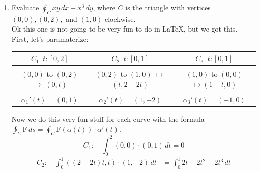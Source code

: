 \documentclass[10pt,oneside]{book}
\newcommand{\dsp}{\displaystyle}
\newcommand{\en}{\vspace{0.25cm}\\}
\newcommand{\centerit}[1]{{\begin{center} #1 \end{center}}}
\begin{document}
\begin{enumerate}
    Next, we need to grab that derivative with respect to time:
    \[\alpha'(t) = (-\sin t, \cos t)\]
    Now, it's just plug and chug with our fancy line integral formula.
    \begin{align*}
        \int_C f\,ds &= \int_C f(\alpha(t))\cdot\alpha'(t)\,dt\\
        \int_C f(\alpha(t))\cdot\alpha'(t)\,dt &= \int_0^{2\pi}(3\sin t + \cos^5t, 2\cos t + e^{\sin t})\cdot (-\sin t, \cos t)\,dt\\
        &=\int_0^{2\pi}-3\sin^2 t + \sin t\cos^5t - 2\cos t\sin t + \cos t e^{\sin t}\,dt\\
        &\quad\text{Note: we use substitution: } 2\cos t\sin t = \sin 2t,\text{ and } \sin^2 t = \frac{1}2(1-\cos(2t))\\
        &=\left[-\frac{3}2t-\frac{1}6\cos^6t+\frac{1}2\cos(2t) + e^{\sin t}\right]\Big|_0^{2\pi}\\
        &\quad\text{Note: All terms except } \frac{3}2t \text{ cancel.}\\
        &= \boxed{-3\pi}
    \end{align*}
    \item Evaluate $\dsp\oint_C xy\,dx + x^3\,dy$, where $C$ is the triangle with vertices $(0,0), (0,2), $ and $(1,0)$ clockwise.\en
    Ok this one is not going to be very fun to do in \LaTeX, but we got this. First, let's paramaterize:
    \centerit{
        \begin{tabular}{ccc}
            $C_1\;\;t:[0,2]$ & $C_2\;\;t:[0,1]$ & $C_3\;\;t:[0,1]$\\
            \hline\\
            $(0,0)$ to $(0,2)$ $\mapsto$ $\boxed{(0,t)}$ & $(0,2)$ to $(1,0)$ $\mapsto$ $\boxed{(t,2-2t)}$ & $(1,0)$ to $(0,0)$ $\mapsto\boxed{(1-t,0)}$  \vspace{0.3cm}\\
            \hline\\
            $\boxed{\alpha_1'(t) = (0,1)}$ & $\boxed{\alpha_2'(t) = (1,-2)}$ & $\boxed{\alpha_3'(t) = (-1,0)}$
        \end{tabular}
    } 
    \newpage
    Now we do this very fun stuff for each curve with the formula $\dsp\oint_C \mathrm{F}\,ds = \oint_C \mathrm F(\alpha(t))\cdot \alpha'(t)$.\vspace{-0.3cm}
    \[C_1:\quad\int_0^2(0,0)\cdot (0,1)\,dt = 0\]\vspace{-0.5cm}
    \begin{align*}
        C_2:\quad\int_0^1((2-2t)t, t)\cdot(1, -2)\,dt &= \int_0^1 2 t - 2 t^2 - 2 t^3\,dt\\

\end{align*}
\end{enumerate}
\end{document}
